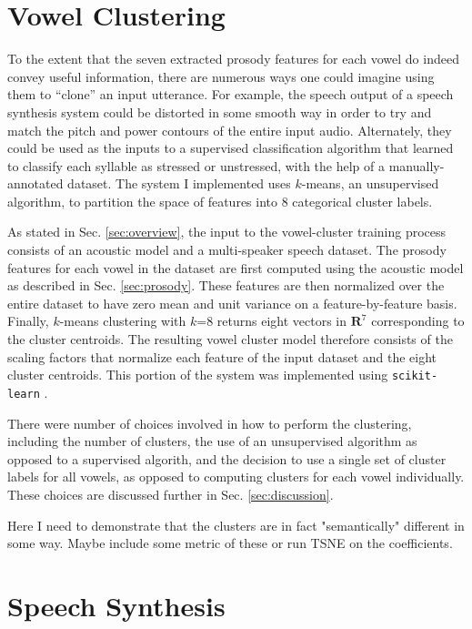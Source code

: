 \documentclass{article}
\begin{document}
\section{Vowel Clustering}
\label{sec:vowels}

To the extent that the seven extracted prosody features for each vowel do indeed convey useful information, there are numerous ways one could imagine using them to ``clone'' an input utterance.
For example, the speech output of a speech synthesis system could be distorted in some smooth way in order to try and match the pitch and power contours of the entire input audio.
Alternately, they could be used as the inputs to a supervised classification algorithm that learned to classify each syllable as stressed or unstressed, with the help of a manually-annotated dataset.
The system I implemented uses $k$-means, an unsupervised algorithm, to partition the space of features into 8 categorical cluster labels.

As stated in Sec. \ref{sec:overview}, the input to the vowel-cluster training process consists of an acoustic model and a multi-speaker speech dataset.
The prosody features for each vowel in the dataset are first computed using the acoustic model as described in Sec. \ref{sec:prosody}.
These features are then normalized over the entire dataset to have zero mean and unit variance on a feature-by-feature basis.
Finally, $k$-means clustering with $k$=8 returns eight vectors in $\mathbf{R}^7$ corresponding to the cluster centroids.
The resulting vowel cluster model therefore consists of the scaling factors that normalize each feature of the input dataset and the eight cluster centroids. This portion of the system was implemented using \texttt{scikit-learn} \cite{scikit-learn}.

There were number of choices involved in how to perform the clustering, including the number of clusters, the use of an unsupervised algorithm as opposed to a supervised algorith, and the decision to use a single set of cluster labels for all vowels, as opposed to computing clusters for each vowel individually. These choices are discussed further in Sec. \ref{sec:discussion}.


Here I need to demonstrate that the clusters are in fact "semantically" different in some way. Maybe include some metric of these or run TSNE on the coefficients.

\section{Speech Synthesis}
\label{sec:tacotron}
\end{document}
